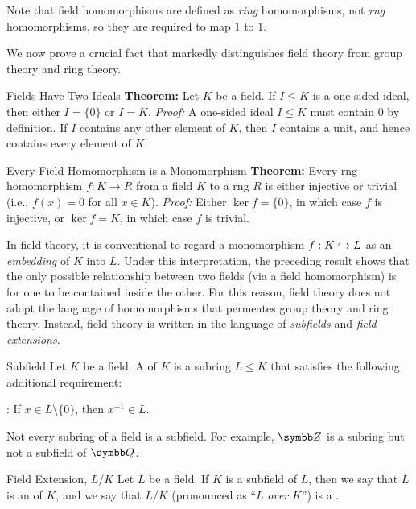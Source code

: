 \documentclass[12pt]{report}
\begin{document}
Note that field homomorphisms are defined as \textit{ring} homomorphisms, not \textit{rng} homomorphisms, so they are required to map $1$ to $1$.

We now prove a crucial fact that markedly distinguishes field theory from group theory and ring theory.

\begin{thmbox}{Fields Have Two Ideals}
	\textbf{Theorem:} Let $K$ be a field. If $I \le K$ is a one-sided ideal, then either $I = \{0\}$ or $I = K$.
\tcblower
	\textit{Proof:} A one-sided ideal $I \le K$ must contain $0$ by definition. If $I$ contains any other element of $K$, then $I$ contains a unit, and hence contains every element of $K$.
\end{thmbox}

\begin{thmbox}{Every Field Homomorphism is a Monomorphism}
	\textbf{Theorem:} Every rng homomorphism $f: K \to R$ from a field $K$ to a rng $R$ is either injective or trivial (i.e., $f(x) = 0$ for all $x \in K$).
\tcblower
	\textit{Proof:} Either $\ker f = \{0\}$, in which case $f$ is injective, or $\ker f = K$, in which case $f$ is trivial.
\end{thmbox}

In field theory, it is conventional to regard a monomorphism $f: K \hookrightarrow L$ as an \textit{embedding} of $K$ into $L$. Under this interpretation, the preceding result shows that the only possible relationship between two fields (via a field homomorphism) is for one to be contained inside the other. For this reason, field theory does not adopt the language of homomorphisms that permeates group theory and ring theory. Instead, field theory is written in the language of \textit{subfields} and \textit{field extensions}.

\begin{dfnbox}{Subfield}
	Let $K$ be a field. A  of $K$ is a subring $L \le K$ that satisfies the following additional requirement:
	\begin{dfnitems}
		\item {}: If $x \in L \setminus \{0\}$, then $x^{-1} \in L$.
	\end{dfnitems}
\end{dfnbox}

Not every subring of a field is a subfield. For example, $\Z$ is a subring but not a subfield of $\Q$.

\begin{dfnbox}{Field Extension, $L/K$}
	Let $L$ be a field. If $K$ is a subfield of $L$, then we say that $L$ is an  of $K$, and we say that $L/K$ (pronounced as ``$L$ \textit{over} $K$'') is a .
\end{dfnbox}
\end{document}

